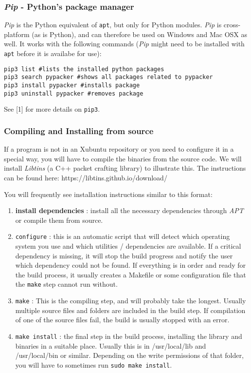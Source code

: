 \documentclass[a4paper]{article}
\begin{document}
\subsubsection{\emph{Pip} - Python's package manager} 
\emph{Pip} is the Python equivalent of \texttt{apt}, but only for Python modules. \emph{Pip} is cross-platform (as is Python), and can therefore be used on Windows and Mac OSX as well. 
It works with the following commands (\emph{Pip} might need to be installed with \texttt{apt} before it is availabe for use): 

\begin{lstlisting}
pip3 list #lists the installed python packages
pip3 search pypacker #shows all packages related to pypacker
pip3 install pypacker #installs package
pip3 uninstall pypacker #removes package
\end{lstlisting}

See [1] for more details on \texttt{pip3}.

\subsubsection{Compiling and Installing from source}
If a program is not in an Xubuntu repository or you need to configure it in a special way, you will have to compile the binaries from the source code. We will install \emph{Libtins} (a C++ packet crafting library) to illustrate this. 
The instructions can be found here: https://libtins.github.io/download/

You will frequently see installation instructions similar to this format: 
\begin{enumerate}
\item \textbf{install dependencies} : install all the necessary dependencies through \emph{APT} or compile them from source. 
\item \texttt{configure} : this is an automatic script that will detect which operating system you use and which utilities / dependencies are available. If a critical dependency is missing, it will stop the build progress and notify the user which dependency could not be found. If everything is in order and ready for the build process, it usually creates a Makefile or some configuration file that the \texttt{make} step cannot run without.  
\item \texttt{make} : This is the compiling step, and will probably take the longest. Usually multiple source files and folders are included in the build step. If compilation of one of the source files fail, the build is usually stopped with an error. 
\item \texttt{make install} : the final step in the build process, installing the library and binaries in a suitable place. Usually this is in /usr/local/lib and /usr/local/bin or similar. Depending on the write permissions of that folder, you will have to sometimes run \texttt{sudo make install}.
\end{enumerate}
\end{document}
